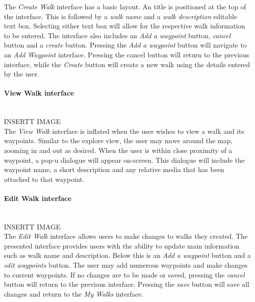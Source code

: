 \documentclass[11pt,a4paper]{report}
\begin{document}
The \emph{Create Walk} interface has a basic layout. An title is positioned at the top of the interface. This is followed by a \emph{walk name} and a \emph{walk description} editable text box. Selecting either text box will allow for the respective walk information to be entered. The interface also includes an \emph{Add a waypoint} button, \emph{cancel} button and a \emph{create} button. Pressing the \emph{Add a waypoint} button will navigate to an \emph{Add Waypoint} interface. Pressing the cancel button will return to the previous interface, while the \emph{Create} button will create a new walk using the details entered by the user.

\paragraph*{View Walk interface}\mbox{}\\

INSERTT IMAGE\\

The \emph{View Walk} interface is inflated when the user wishes to view a walk and its waypoints. Similar to the explore view, the user may move around the map, zooming in and out as desired. When the user is within close proximity of a waypoint, a pop-u dialogue will appear on-screen. This dialogue will include the waypoint name, a short description and any relative media that has been attached to that waypoint. 

\paragraph*{Edit Walk interface}\mbox{}\\
INSERTT IMAGE\\

The \emph{Edit Walk} interface allows users to make changes to walks they created. The presented interface provides users with the ability to update main information such as walk name and description. Below this is an \emph{Add a waypoint} button and a \emph{edit waypoints} button. The user may add numerous waypoints and make changes to current waypoints. If no changes are to be made or saved, pressing the \emph{cancel} button will return to the previous interface. Pressing the \emph{save} button will save all changes and return to the \emph{My Walks} interface.
\end{document}
